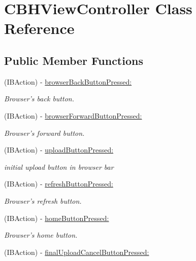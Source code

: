 \hypertarget{interface_c_b_h_view_controller}{\section{C\-B\-H\-View\-Controller Class Reference}
\label{interface_c_b_h_view_controller}
}
\subsection*{Public Member Functions}
\begin{DoxyCompactItemize}
\item 
(I\-B\-Action) -\/ \hyperlink{interface_c_b_h_view_controller_ac4b48111c33f274a6160f4b2ea39c6cf}{browser\-Back\-Button\-Pressed\-:}
\begin{DoxyCompactList}\small\item\em Browser's back button. \end{DoxyCompactList}\item 
(I\-B\-Action) -\/ \hyperlink{interface_c_b_h_view_controller_a3725404e0a3711618b012805d877d698}{browser\-Forward\-Button\-Pressed\-:}
\begin{DoxyCompactList}\small\item\em Browser's forward button. \end{DoxyCompactList}\item 
(I\-B\-Action) -\/ \hyperlink{interface_c_b_h_view_controller_a7bfb39d15e6ff5f1ea9593e79999aa56}{upload\-Button\-Pressed\-:}
\begin{DoxyCompactList}\small\item\em initial upload button in browser bar \end{DoxyCompactList}\item 
(I\-B\-Action) -\/ \hyperlink{interface_c_b_h_view_controller_ae0ed377f106975b88087f3a18cf307ae}{refresh\-Button\-Pressed\-:}
\begin{DoxyCompactList}\small\item\em Browser's refresh button. \end{DoxyCompactList}\item 
(I\-B\-Action) -\/ \hyperlink{interface_c_b_h_view_controller_ae6fff149ad9ab682542ba17084cc4591}{home\-Button\-Pressed\-:}
\begin{DoxyCompactList}\small\item\em Browser's home button. \end{DoxyCompactList}\item 
(I\-B\-Action) -\/ \hyperlink{interface_c_b_h_view_controller_a7a0248ccf94716a4a8021089bef209a0}{final\-Upload\-Cancel\-Button\-Pressed\-:}

\end{DoxyCompactItemize}
